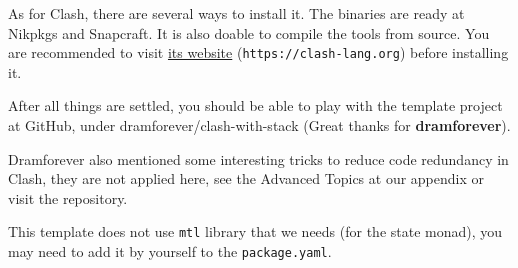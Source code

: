 As for Clash, there are several ways to install it. The binaries are ready at Nikpkgs and Snapcraft. It is also doable to compile the tools from source. You are recommended to visit \href{https://clash-lang.org}{its website} (\texttt{https://clash-lang.org}) before installing it.

After all things are settled, you should be able to play with the template project at GitHub, under dramforever/clash-with-stack (Great thanks for \textbf{dramforever}).

Dramforever also mentioned some interesting tricks to reduce code redundancy in Clash, they are not applied here, see the Advanced Topics at our appendix or visit the repository.

This template does not use \texttt{mtl} library that we needs (for the state monad), you may need to add it by yourself to the \texttt{package.yaml}.